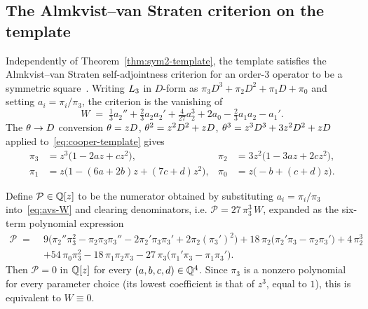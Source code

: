 \subsection{The Almkvist--van Straten criterion on the template}

Independently of Theorem~\ref{thm:sym2-template}, the template satisfies the
Almkvist--van Straten self-adjointness criterion for an order-3 operator to be
a symmetric square~\cite{AlmkvistvanStraten2021}. Writing $L_3$ in $D$-form
as $\pi_3 D^3 + \pi_2 D^2 + \pi_1 D + \pi_0$ and setting $a_i = \pi_i/\pi_3$,
the criterion is the vanishing of
\begin{equation}\label{eq:avs-W}
  W \;=\; \tfrac13 a_2'' + \tfrac23 a_2 a_2' + \tfrac{4}{27}a_2^3
        + 2a_0 - \tfrac23 a_1 a_2 - a_1'.
\end{equation}
The $\theta\to D$ conversion $\theta = zD$, $\theta^2 = z^2D^2+zD$,
$\theta^3 = z^3D^3+3z^2D^2+zD$ applied to~\eqref{eq:cooper-template} gives
\begin{equation}\label{eq:dform-coeffs}
\begin{aligned}
  \pi_3 &= z^3\bigl(1-2az+cz^2\bigr), &
  \pi_2 &= 3z^2\bigl(1-3az+2cz^2\bigr), \\
  \pi_1 &= z\bigl(1-(6a+2b)z+(7c+d)z^2\bigr), &
  \pi_0 &= z\bigl(-b+(c+d)z\bigr).
\end{aligned}
\end{equation}

\begin{theorem}\label{thm:avs}
Define $\mathcal{P} \in \mathbb{Q}[z]$ to be the numerator obtained by substituting
$a_i = \pi_i/\pi_3$ into~\eqref{eq:avs-W} and clearing denominators, i.e.
$\mathcal{P} = 27\,\pi_3^3\,W$, expanded as the six-term polynomial expression
\[
\begin{aligned}
  \mathcal{P} \;=\;{}& 9\bigl(\pi_2''\pi_3^2 - \pi_2\pi_3\pi_3''
     - 2\pi_2'\pi_3\pi_3' + 2\pi_2(\pi_3')^2\bigr)
   + 18\,\pi_2\bigl(\pi_2'\pi_3 - \pi_2\pi_3'\bigr)
   + 4\,\pi_2^3 \\
  &+ 54\,\pi_0\pi_3^2
   - 18\,\pi_1\pi_2\pi_3
   - 27\,\pi_3\bigl(\pi_1'\pi_3 - \pi_1\pi_3'\bigr).
\end{aligned}
\]
Then $\mathcal{P} = 0$ in $\mathbb{Q}[z]$ for every $(a,b,c,d)\in\mathbb{Q}^4$. Since $\pi_3$
is a nonzero polynomial for every parameter choice (its lowest coefficient is
that of $z^3$, equal to $1$), this is equivalent to $W\equiv 0$.
\end{theorem}

